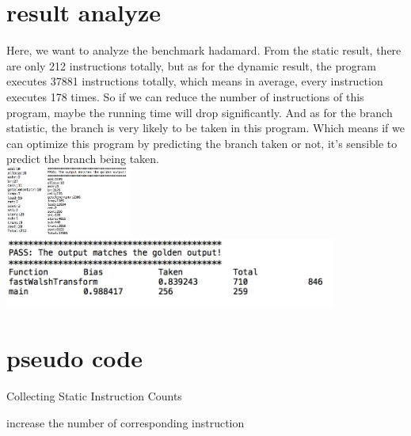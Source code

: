 \documentclass{article}
\begin{document}
\section{result analyze}


Here, we want to analyze the benchmark hadamard. From the static result, there are only 212 instructions totally, but as for the dynamic result, the program executes 37881 instructions totally, which means in average, every instruction executes 178 times. So if we can reduce the number of instructions of this program, maybe the running time will drop significantly. And as for the branch statistic, the branch is very likely to be taken in this program. Which means if we can optimize this program by predicting the branch taken or not, it's sensible to predict the branch being taken.\\


\includegraphics[height=2.3cm]{static.png}
\includegraphics[height=2.3cm]{dynamic.png}
\includegraphics[height=2.3cm]{branch.png}\\
\section{pseudo code}

\begin{algorithm}[htb]
\caption{ Collecting Static Instruction Counts }
\begin{algorithmic}
			\STATE increase the number of corresponding instruction
		\ENDFOR
	\ENDFOR
\ENDFOR
\end{algorithmic}
\end{algorithm}
\end{document}
